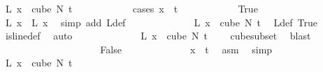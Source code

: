 \begin{isabellebody}
\ {\isachardoublequoteopen}L{\isacharprime}{\kern0pt}\ x\ {\isasymin}\ cube\ N{\isacharprime}{\kern0pt}\ {\isacharparenleft}{\kern0pt}t\ {\isacharplus}{\kern0pt}\ {}{\isacharparenright}{\kern0pt}{\isachardoublequoteclose}\isanewline
\ \ \ \ \ \ \ \ \isamarkupfalse%
\ {\isacharparenleft}{\kern0pt}cases\ {\isachardoublequoteopen}x\ {\isacharless}{\kern0pt}\ t{\isachardoublequoteclose}{\isacharparenright}{\kern0pt}\isanewline
\ \ \ \ \ \ \ \ \ \ \isamarkupfalse%
\ True\isanewline
\ \ \ \ \ \ \ \ \ \ \isamarkupfalse%
\ \isamarkupfalse%
\ {\isachardoublequoteopen}L{\isacharprime}{\kern0pt}\ x\ {\isacharequal}{\kern0pt}\ L\ x{\isachardoublequoteclose}\ \isamarkupfalse%
\ {\isacharparenleft}{\kern0pt}simp\ add{\isacharcolon}{\kern0pt}\ L{\isacharprime}{\kern0pt}{\isacharunderscore}{\kern0pt}def{\isacharparenright}{\kern0pt}\isanewline
\ \ \ \ \ \ \ \ \ \ \isamarkupfalse%
\ \isamarkupfalse%
\ {\isachardoublequoteopen}L{\isacharprime}{\kern0pt}\ x\ {\isasymin}\ cube\ N{\isacharprime}{\kern0pt}\ t{\isachardoublequoteclose}\ \isamarkupfalse%
\ L{\isacharunderscore}{\kern0pt}def\ True\ \isamarkupfalse%
\ is{\isacharunderscore}{\kern0pt}line{\isacharunderscore}{\kern0pt}def\ \isamarkupfalse%
\ auto\isanewline
\ \ \ \ \ \ \ \ \ \ \isamarkupfalse%
\ \isamarkupfalse%
\ {\isachardoublequoteopen}L{\isacharprime}{\kern0pt}\ x\ {\isasymin}\ cube\ N{\isacharprime}{\kern0pt}\ {\isacharparenleft}{\kern0pt}t\ {\isacharplus}{\kern0pt}\ {}{\isacharparenright}{\kern0pt}{\isachardoublequoteclose}\ \isamarkupfalse%
\ cube{\isacharunderscore}{\kern0pt}subset\ \isamarkupfalse%
\ blast\isanewline
\ \ \ \ \ \ \ \ \isamarkupfalse%
\isanewline
\ \ \ \ \ \ \ \ \ \ \isamarkupfalse%
\ False\isanewline
\ \ \ \ \ \ \ \ \ \ \isamarkupfalse%
\ \isamarkupfalse%
\ {\isachardoublequoteopen}x\ {\isacharequal}{\kern0pt}\ t{\isachardoublequoteclose}\ \isamarkupfalse%
\ asm\ \isamarkupfalse%
\ simp\isanewline
\ \ \ \ \ \ \ \ \ \ \isamarkupfalse%
\ {\isachardoublequoteopen}L{\isacharprime}{\kern0pt}\ x\ {\isasymin}\ cube\ N{\isacharprime}{\kern0pt}\ {\isacharparenleft}{\kern0pt}t\ {\isacharplus}{\kern0pt}\ {}{\isacharparenright}{\kern0pt}{\isachardoublequoteclose}\isanewline
\ \ \ \ \ \ \ \ \ \ \isamarkupfalse%

\end{isabellebody}
